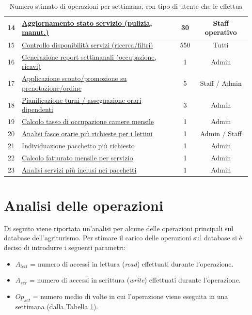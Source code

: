 \documentclass[a4paper,12pt]{report}
\begin{document}
\begin{table}[H]
\begin{tabularx}{\textwidth}{|c|>{\raggedright\arraybackslash}X|c|c|}
		\hline
		14          & \hyperref[op14]{Aggiornamento stato servizio (pulizia, manut.)}        & 30            & Staff operativo        \\
		\hline
		15          & \hyperref[op15]{Controllo disponibilità servizi (ricerca/filtri)}      & 550          & Tutti                  \\
		\hline
		16          & \hyperref[op16]{Generazione report settimanali (occupazione, ricavi)}  & 1              & Admin                  \\
		\hline
		17          & \hyperref[op17]{Applicazione sconto/promozione su prenotazione/ordine} & 5             & Staff / Admin          \\
		\hline
		18          & \hyperref[op18]{Pianificazione turni / assegnazione orari dipendenti}  & 3              & Admin                  \\
		\hline
		19          & \hyperref[op19]{Calcolo tasso di occupazione camere mensile}           & 1              & Admin                  \\
		\hline
		20          & \hyperref[op20]{Analisi fasce orarie più richieste per i lettini}      & 1              & Admin / Staff          \\
		\hline
		21          & \hyperref[op21]{Individuazione pacchetto più richiesto}                & 1              & Admin                  \\
		\hline
		22          & \hyperref[op22]{Calcolo fatturato mensile per servizio}                & 1              & Admin                  \\
		\hline
		23          & \hyperref[op23]{Analisi servizi più inclusi nei pacchetti}             & 1              & Admin                  \\
		\hline
	\end{tabularx}
	\caption{Numero stimato di operazioni per settimana, con tipo di utente che le effettua}
	\label{tab:operazioni-settimanali}
\end{table}

\newpage
\section{Analisi delle operazioni}
Di seguito viene riportata un'analisi per alcune delle operazioni principali sul database dell'agriturismo.
Per stimare il carico delle operazioni sul database si è deciso di introdurre i seguenti parametri:
\begin{itemize}
    \item $A_{lett}$ = numero di accessi in lettura (\textit{read}) effettuati durante l'operazione.
    \item $A_{scr}$ = numero di accessi in scrittura (\textit{write}) effettuati durante l'operazione.
    \item $Op_{set}$ = numero medio di volte in cui l'operazione viene eseguita in una settimana (dalla Tabella \ref{tab:operazioni-settimanali}).
\end{itemize}
\end{document}
